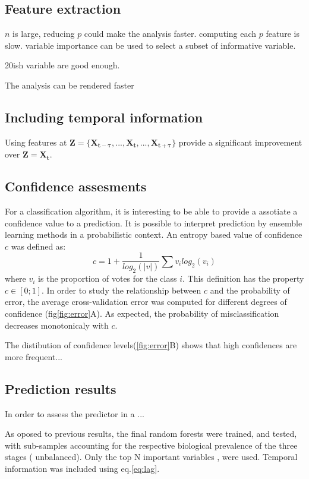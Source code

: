 \subsection{Feature extraction}



$n$ is large, reducing $p$ could make the analysis faster. computing each $p$ feature is slow.
variable importance can be used to select a subset of informative variable.

20ish variable are good enough.

The analysis can be rendered faster
\subsection{Including temporal information}
Using features at $\mathbf{Z} = \{\mathbf{X_{t-\tau}}, ..., \mathbf{X_{t}}, ..., \mathbf{X_{t+\tau}}\}$ provide a significant improvement over $\mathbf{Z} = \mathbf{X_{t}}$.


\subsection{Confidence assesments}
For a classification algorithm, it is interesting to be able to provide a assotiate a confidence value to a prediction.
It is possible to interpret prediction by ensemble learning methods in a probabilistic context.
An entropy based value of confidence $c$ was defined as:
\begin{equation}
c = 1 + \frac{1}{log_2(|v|)}\sum{v_i  log_2(v_i)}
\end{equation}
where $v_i$ is the proportion of votes for the class $i$.
This definition has the property $c \in [0;1]$.
In order to study the relationship between $c$ and the probability of error,
the average cross-validation error was computed for different degrees of confidence (fig\ref{fig:error}A).
As expected, the probability of misclassification decreases monotonicaly with $c$.

The distibution of confidence levels(\ref{fig:error}B) shows that high confidences are more frequent... 

\subsection{Prediction results}

In order to assess the predictor in a ...

As oposed to previous results, the final random forests were trained, and tested, with sub-samples accounting for the respective biological prevalence of the three stages (\ie{} unbalanced).
Only the top N\TODO{} important variables , were used. Temporal information was included using eq.\ref{eq:lag}.



